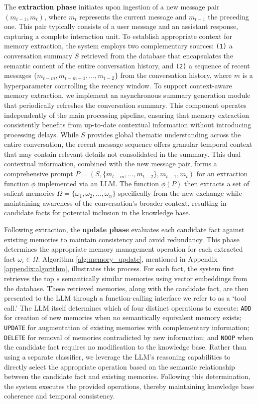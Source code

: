 The \textbf{extraction phase} initiates upon ingestion of a new message pair $(m_{t-1}, m_t)$, where $m_t$ represents the current message and $m_{t-1}$ the preceding one. This pair typically consists of a user message and an assistant response, capturing a complete interaction unit. To establish appropriate context for memory extraction, the system employs two complementary sources: \texttt{(1)} a conversation summary $S$ retrieved from the database that encapsulates the semantic content of the entire conversation history, and \texttt{(2)} a sequence of recent messages $\{m_{t-m}, m_{t-m+1}, ..., m_{t-2}\}$ from the conversation history, where $m$ is a hyperparameter controlling the recency window. To support context-aware memory extraction, we implement an asynchronous summary generation module that periodically refreshes the conversation summary. This component operates independently of the main processing pipeline, ensuring that memory extraction consistently benefits from up-to-date contextual information without introducing processing delays. While $S$ provides global thematic understanding across the entire conversation, the recent message sequence offers granular temporal context that may contain relevant details not consolidated in the summary. This dual contextual information, combined with the new message pair, forms a comprehensive prompt $P = (S, \{m_{t-m}, ..., m_{t-2}\}, m_{t-1}, m_t)$ for an extraction function $\phi$ implemented via an LLM. The function $\phi(P)$ then extracts a set of salient memories $\Omega = \{\omega_1, \omega_2, ..., \omega_n\}$ specifically from the new exchange while maintaining awareness of the conversation's broader context, resulting in candidate facts for potential inclusion in the knowledge base. 

Following extraction, the \textbf{update phase} evaluates each candidate fact against existing memories to maintain consistency and avoid redundancy. This phase determines the appropriate memory management operation for each extracted fact $\omega_i \in \Omega$. Algorithm \ref{alg:memory_update}, mentioned in Appendix \ref{appendix:algorithm}, illustrates this process. For each fact, the system first retrieves the top $s$ semantically similar memories using vector embeddings from the database. These retrieved memories, along with the candidate fact, are then presented to the LLM through a function-calling interface we refer to as a `tool call.' The LLM itself determines which of four distinct operations to execute: \texttt{ADD} for creation of new memories when no semantically equivalent memory exists; \texttt{UPDATE} for augmentation of existing memories with complementary information; \texttt{DELETE} for removal of memories contradicted by new information; and \texttt{NOOP} when the candidate fact requires no modification to the knowledge base. Rather than using a separate classifier, we leverage the LLM's reasoning capabilities to directly select the appropriate operation based on the semantic relationship between the candidate fact and existing memories. Following this determination, the system executes the provided operations, thereby maintaining knowledge base coherence and temporal consistency.
 

